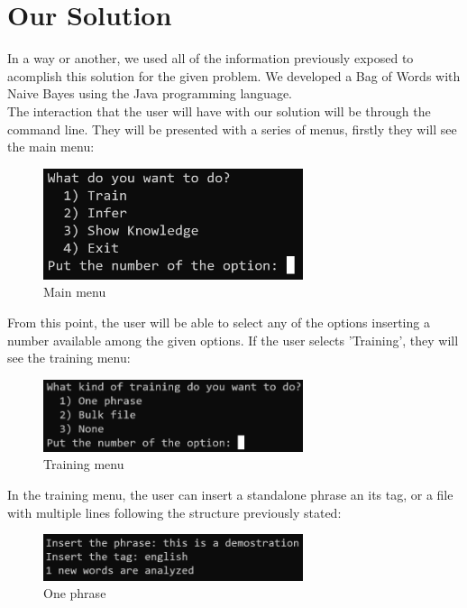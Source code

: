 \documentclass[sigconf,12pt,review=false,natbib=false]{acmart}
\begin{document}
\section{Our Solution}

In a way or another, we used all of the information previously exposed to acomplish this solution for the given problem.
We developed a Bag of Words with Naive Bayes using the Java programming language. \\

The interaction that the user will have with our solution will be through the command line. They will be presented
with a series of menus, firstly they will see the main menu: \\

\begin{figure}[h!]
    \centering
    \includegraphics[width=3in]{main_menu}
    \caption{Main menu}
    \label{fig:main_menu}
\end{figure}

From this point, the user will be able to select any of the options inserting a number available among the given
options. If the user selects 'Training', they will see the training menu: \\

\begin{figure}[h!]
    \centering
    \includegraphics[width=3in]{training_menu}
    \caption{Training menu}
    \label{fig:training_menu}
\end{figure}

In the training menu, the user can insert a standalone phrase an its tag, or a file with multiple lines following the
structure previously stated: \\

\begin{figure}[h!]
    \centering
    \includegraphics[width=3in]{one_phrase}
    \caption{One phrase}
    \label{fig:one_phrase}
\end{figure}
\end{document}
